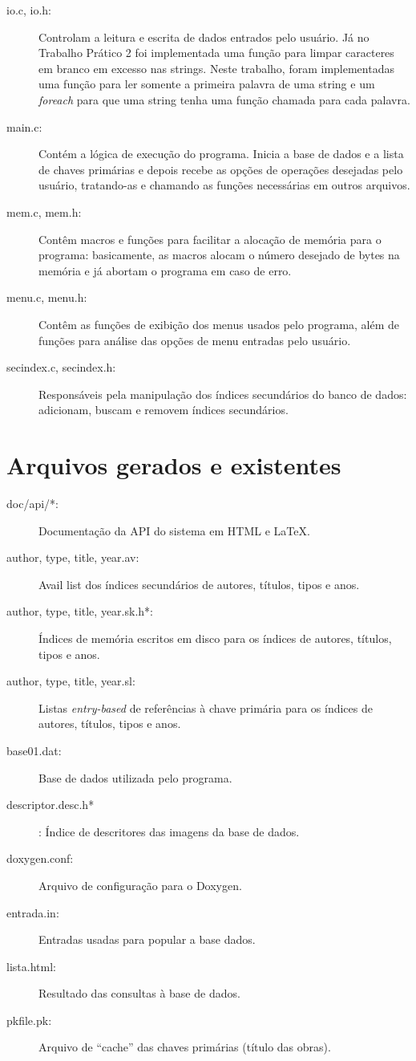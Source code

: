 \documentclass[a4paper,10pt]{article}
\begin{document}
\begin{description}
 \item[io.c, io.h:] Controlam a leitura e escrita de dados entrados pelo usuário. Já no Trabalho Prático 2 foi implementada uma função para limpar caracteres em branco em excesso nas strings. Neste trabalho, foram implementadas uma função para ler somente a primeira palavra de uma string e um \textit{foreach} para que uma string tenha uma função chamada para cada palavra.

 \item[main.c:] Contém a lógica de execução do programa. Inicia a base de dados e a lista de chaves primárias e depois recebe as opções de operações desejadas pelo usuário, tratando-as e chamando as funções necessárias em outros arquivos.

 \item[mem.c, mem.h:] Contêm macros e funções para facilitar a alocação de memória para o programa: basicamente, as macros alocam o número desejado de bytes na memória e já abortam o programa em caso de erro.
	
 \item[menu.c, menu.h:] Contêm as funções de exibição dos menus usados pelo programa, além de funções para análise das opções de menu entradas pelo usuário.

 \item[secindex.c, secindex.h:] Responsáveis pela manipulação dos índices secundários do banco de dados: adicionam, buscam e removem índices secundários.
\end{description}

\section{Arquivos gerados e existentes}
\begin{description}
\item[doc/api/*:] Documentação da API do sistema em HTML e LaTeX.
\item[author, type, title, year.av:] Avail list dos índices secundários de autores, títulos, tipos e anos.
\item[author, type, title, year.sk.h*:] Índices de memória escritos em disco para os índices de autores, títulos, tipos e anos.
\item[author, type, title, year.sl:] Listas \textit{entry-based} de referências à chave primária para os índices de autores, títulos, tipos e anos.
\item[base01.dat:] Base de dados utilizada pelo programa.
\item[descriptor.desc.h*]: Índice de descritores das imagens da base de dados.
\item[doxygen.conf:] Arquivo de configuração para o Doxygen.
\item[entrada.in:] Entradas usadas para popular a base dados.
\item[lista.html:] Resultado das consultas à base de dados.
\item[pkfile.pk:] Arquivo de ``cache'' das chaves primárias (título das obras).
\end{description}
\end{document}
